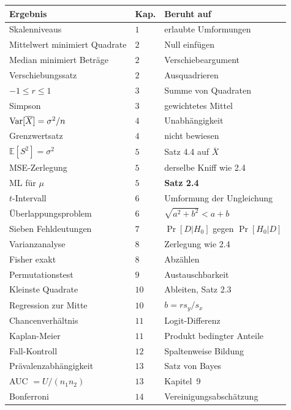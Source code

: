 \begin{merksatz}
\begin{center}
{\small
\renewcommand{\arraystretch}{1.42}
\begin{tabular}{@{}P{3.4cm}P{1.2cm}P{3.6cm}@{}}
\toprule
\textbf{Ergebnis} & \textbf{Kap.} & \textbf{Beruht auf}\\
\midrule
Skalenniveaus & $1$ & erlaubte Umformungen\\
Mittelwert minimiert Quadrate & $2$ & Null einfügen\\
Median minimiert Beträge & $2$ & Verschiebeargument\\
Verschiebungssatz & $2$ & Ausquadrieren\\
$-1 \le r \le 1$ & $3$ & Summe von Quadraten\\
Simpson & $3$ & gewichtetes Mittel\\
$\operatorname{Var}[\overline X] = \sigma^2/n$ & $4$ & Unabhängigkeit\\
Grenzwertsatz & $4$ & \textcolor{grau}{nicht bewiesen}\\
$\mathbb{E}[S^2] = \sigma^2$ & $5$ & Satz 4.4 auf $\overline X$\\
MSE-Zerlegung & $5$ & derselbe Kniff wie 2.4\\
ML für $\mu$ & $5$ & \textbf{Satz 2.4}\\
$t$-Intervall & $6$ & Umformung der Ungleichung\\
Überlappungs\-problem & $6$ & $\sqrt{a^2+b^2} < a+b$\\
Sieben Fehldeutungen & $7$ & $\Pr[D|H_0]$ gegen $\Pr[H_0|D]$\\
Varianzanalyse & $8$ & Zerlegung wie 2.4\\
Fisher exakt & $8$ & Abzählen\\
Permutationstest & $9$ & Austauschbarkeit\\
Kleinste Quadrate & $10$ & Ableiten, Satz 2.3\\
Regression zur Mitte & $10$ & $b = rs_y/s_x$\\
Chancenverhältnis & $11$ & Logit-Differenz\\
Kaplan-Meier & $11$ & Produkt bedingter Anteile\\
Fall-Kontroll & $12$ & Spaltenweise Bildung\\
Prävalenz\-abhängigkeit & $13$ & Satz von Bayes\\
AUC $= U/(n_1n_2)$ & $13$ & Kapitel~9\\
Bonferroni & $14$ & Vereinigungs\-abschätzung\\
\bottomrule
\end{tabular}}
\end{center}
\end{merksatz}

